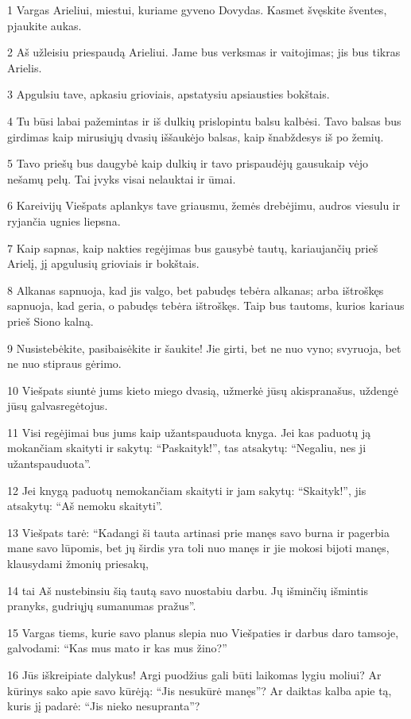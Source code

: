 \par 1 Vargas Arieliui, miestui, kuriame gyveno Dovydas. Kasmet švęskite šventes, pjaukite aukas. 
\par 2 Aš užleisiu priespaudą Arieliui. Jame bus verksmas ir vaitojimas; jis bus tikras Arielis. 
\par 3 Apgulsiu tave, apkasiu grioviais, apstatysiu apsiausties bokštais. 
\par 4 Tu būsi labai pažemintas ir iš dulkių prislopintu balsu kalbėsi. Tavo balsas bus girdimas kaip mirusiųjų dvasių iššaukėjo balsas, kaip šnabždesys iš po žemių. 
\par 5 Tavo priešų bus daugybė kaip dulkių ir tavo prispaudėjų gausu­kaip vėjo nešamų pelų. Tai įvyks visai nelauktai ir ūmai. 
\par 6 Kareivijų Viešpats aplankys tave griausmu, žemės drebėjimu, audros viesulu ir ryjančia ugnies liepsna. 
\par 7 Kaip sapnas, kaip nakties regėjimas bus gausybė tautų, kariaujančių prieš Arielį, jį apgulusių grioviais ir bokštais. 
\par 8 Alkanas sapnuoja, kad jis valgo, bet pabudęs tebėra alkanas; arba ištroškęs sapnuoja, kad geria, o pabudęs tebėra ištroškęs. Taip bus tautoms, kurios kariaus prieš Siono kalną. 
\par 9 Nusistebėkite, pasibaisėkite ir šaukite! Jie girti, bet ne nuo vyno; svyruoja, bet ne nuo stipraus gėrimo. 
\par 10 Viešpats siuntė jums kieto miego dvasią, užmerkė jūsų akis­pranašus, uždengė jūsų galvas­regėtojus. 
\par 11 Visi regėjimai bus jums kaip užantspauduota knyga. Jei kas paduotų ją mokančiam skaityti ir sakytų: “Paskaityk!”, tas atsakytų: “Negaliu, nes ji užantspauduota”. 
\par 12 Jei knygą paduotų nemokančiam skaityti ir jam sakytų: “Skaityk!”, jis atsakytų: “Aš nemoku skaityti”. 
\par 13 Viešpats tarė: “Kadangi ši tauta artinasi prie manęs savo burna ir pagerbia mane savo lūpomis, bet jų širdis yra toli nuo manęs ir jie mokosi bijoti manęs, klausydami žmonių priesakų, 
\par 14 tai Aš nustebinsiu šią tautą savo nuostabiu darbu. Jų išminčių išmintis pranyks, gudriųjų sumanumas pražus”. 
\par 15 Vargas tiems, kurie savo planus slepia nuo Viešpaties ir darbus daro tamsoje, galvodami: “Kas mus mato ir kas mus žino?” 
\par 16 Jūs iškreipiate dalykus! Argi puodžius gali būti laikomas lygiu moliui? Ar kūrinys sako apie savo kūrėją: “Jis nesukūrė manęs”? Ar daiktas kalba apie tą, kuris jį padarė: “Jis nieko nesupranta”? 
